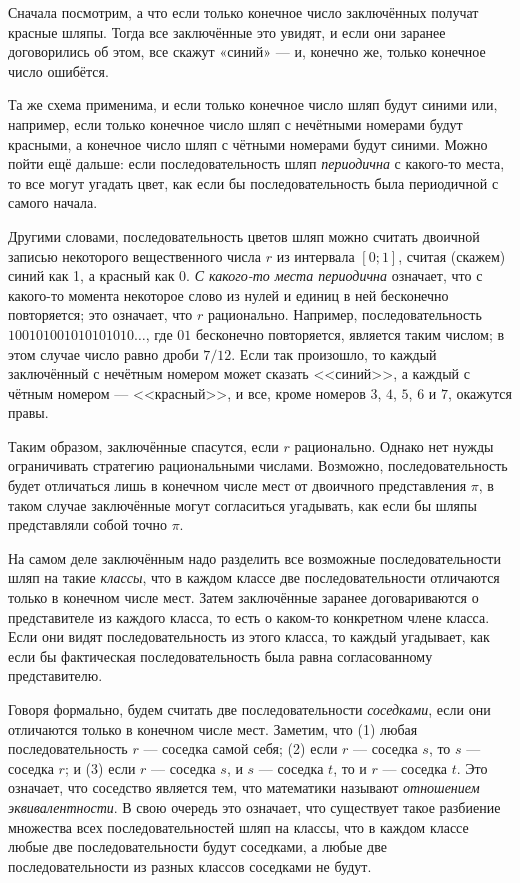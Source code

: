 Сначала посмотрим, а что если только конечное число заключённых получат красные шляпы.
Тогда все заключённые это увидят, и если они заранее договорились об этом, все скажут «синий» --- и, конечно же, только конечное число ошибётся.

Та же схема применима, и если только конечное число шляп будут синими или, например, если только конечное число шляп с нечётными номерами будут красными, а конечное число шляп с чётными номерами будут синими.
Можно пойти ещё дальше: если последовательность шляп \emph{периодична} с какого-то места, то все могут угадать цвет, как если бы последовательность была периодичной с самого начала.

Другими словами, последовательность цветов шляп можно считать двоичной записью некоторого вещественного числа $r$ из интервала $[0;1]$, считая (скажем) синий как 1, а красный как 0.
\emph{С какого-то места периодична} означает, что с какого-то момента некоторое слово из нулей и единиц в ней бесконечно повторяется;
это означает, что $r$ рационально.
Например, последовательность $100101001010101010\dots$, где $01$ бесконечно повторяется, является таким числом; в этом случае число равно дроби $7/12$.
Если так произошло, то каждый заключённый с нечётным номером может сказать <<синий>>, а каждый с чётным номером --- <<красный>>, и все, кроме номеров $3$, $4$, $5$, $6$ и $7$, окажутся правы.

Таким образом, заключённые спасутся, если $r$ рационально.
Однако нет нужды ограничивать стратегию рациональными числами.
Возможно, последовательность будет отличаться лишь в конечном числе мест от двоичного представления $\pi$, в таком случае заключённые могут согласиться угадывать, как если бы шляпы представляли собой точно $\pi$.

На самом деле заключённым надо разделить все возможные последовательности шляп на такие \emph{классы}, что в каждом классе две последовательности отличаются только в конечном числе мест.
Затем заключённые заранее договариваются о представителе из каждого класса, то есть о каком-то конкретном члене класса.
Если они видят последовательность из этого класса, то каждый угадывает, как если бы фактическая последовательность была равна согласованному представителю.

Говоря формально, будем считать две последовательности \emph{соседками}, если они отличаются только в конечном числе мест.
Заметим, что
(1) любая последовательность $r$ --- соседка самой себя;
(2) если $r$ --- соседка $s$, то $s$ --- соседка $r$; и
(3) если $r$ --- соседка $s$, и $s$ --- соседка $t$, то и $r$ --- соседка $t$.
Это означает, что соседство является тем, что математики называют \emph{отношением эквивалентности}.
В свою очередь это означает, что существует такое разбиение множества всех последовательностей шляп на классы, что в каждом классе любые две последовательности будут соседками, а любые две последовательности из разных классов соседками не будут.

